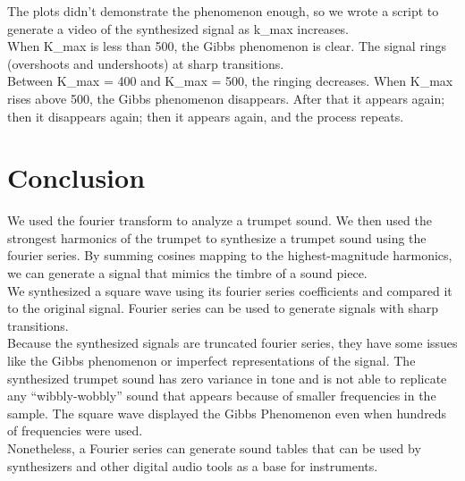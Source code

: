 \documentclass[11pt]{article}
\begin{document}
The plots didn't demonstrate the phenomenon enough,
so we wrote a script to generate a video of the synthesized signal
as k\_{max} increases.\\

When K\_{max} is less than 500, the Gibbs phenomenon is clear.
The signal rings (overshoots and undershoots) at sharp transitions.\\

Between K\_{max} = 400 and K\_{max} = 500, the ringing decreases.
When K\_{max} rises above 500, the Gibbs phenomenon disappears.
After that it appears again; then it disappears again; 
then it appears again, and the process repeats.

\begin{framed}
	
\end{framed}

\section{Conclusion}

We used the fourier transform to analyze a trumpet sound.
We then used the strongest harmonics of the trumpet to synthesize a trumpet sound using the fourier series.
By summing cosines mapping to the highest-magnitude harmonics, we can generate a signal that mimics the timbre of a sound piece.\\

We synthesized a square wave using its fourier series coefficients and compared it to the original signal.
Fourier series can be used to generate signals with sharp transitions.\\

Because the synthesized signals are truncated fourier series, they have some issues
like the Gibbs phenomenon or imperfect representations of the signal.
The synthesized trumpet sound has zero variance in tone and is not able to replicate any ``wibbly-wobbly'' sound that appears because of smaller frequencies in the sample.
The square wave displayed the Gibbs Phenomenon even when hundreds of frequencies were used.\\

Nonetheless, a Fourier series can generate sound tables that can be used by synthesizers and other digital audio tools as a base for instruments.
\end{document}
